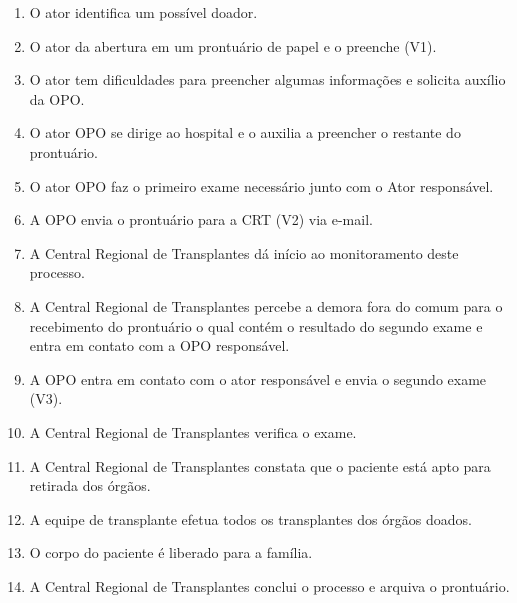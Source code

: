 \documentclass[portuguese,oneside]{tcc}
\begin{document}
\begin{enumerate}

\item O ator identifica um possível doador.
\item O ator da abertura em um prontuário de papel e o preenche (V1).
\item O ator  tem dificuldades para preencher algumas informações e solicita auxílio da OPO.

\item O ator OPO se dirige ao hospital e o auxilia a preencher o restante do prontuário.

\item O ator OPO faz o primeiro exame necessário junto com o Ator responsável.

\item A OPO envia o prontuário para a CRT (V2) via e-mail.

\item A Central Regional de Transplantes dá início ao monitoramento deste processo.

\item A Central Regional de Transplantes percebe a demora fora do comum para o recebimento do prontuário o qual contém o resultado do segundo exame e entra em contato com a OPO responsável.

\item A OPO entra em contato com o ator responsável e envia o segundo exame (V3). 

\item A Central Regional de Transplantes verifica o exame.

\item A Central Regional de Transplantes constata que o paciente está apto para retirada dos órgãos.

\item A equipe de transplante efetua todos os transplantes dos órgãos doados.

\item O corpo do paciente é liberado para a família.

\item A Central Regional de Transplantes conclui o processo e arquiva o prontuário.
\end{enumerate}

\end{document}
